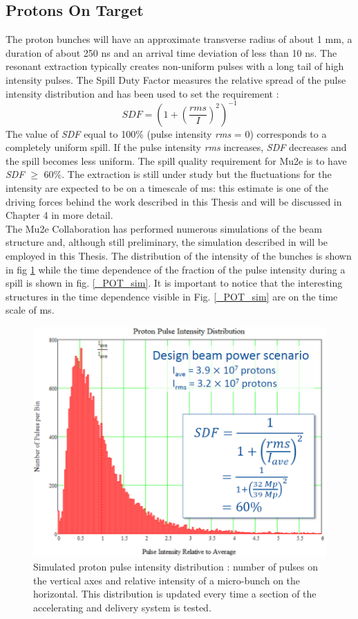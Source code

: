 \documentclass[12pt,a4paper,openright, oneside, titlepage]{book} %
\begin{document}
\subsection{Protons On Target}
The proton bunches will have an approximate transverse radius of about 1 mm, a duration of about 250 ns and an arrival time deviation of less than 10 ns.
The resonant extraction typically creates non-uniform pulses with a long tail of high intensity pulses. 
The Spill Duty Factor measures the relative spread of the pulse intensity distribution and has been used to set the requirement \cite{BeamRequirements}:
$$SDF=\left(1+\left(\frac{rms}{I}\right)^2\right)^{-1}$$
The value of {\em SDF} equal to 100\% (pulse intensity {\em rms} = 0) corresponds to a completely uniform spill. 
If the pulse intensity {\em rms} increases, {\em SDF} decreases and the spill becomes less uniform.
The spill quality requirement for Mu2e is to have {\em SDF} $\geqslant$  60\%.
The extraction is still under study but the fluctuations for the intensity are expected to be on a timescale of ms: 
this estimate is one of the driving forces behind the work described in this Thesis and will be discussed 
in Chapter 4 in more detail.\\
The Mu2e Collaboration has performed numerous simulations of the beam structure and, 
although still preliminary, the simulation described in \cite{SpillSim} will be employed in this Thesis. 
The distribution of the intensity of the bunches is shown in fig \ref{_POT_distribution} 
while the time dependence of the fraction of the pulse intensity during a spill is shown in fig. \ref{_POT_sim}. 
It is important to notice that the interesting structures in the time dependence 
visible in Fig. \ref{_POT_sim} are on the time scale of ms.
\label{_Fluctuations}

\begin{figure}[h!]
\centering
\includegraphics[scale=0.7]{POT_distribution}
\caption[Proton pulse intensity]{Simulated proton pulse intensity distribution \cite{SpillSim}: 
number of pulses on the vertical axes and relative intensity of a micro-bunch on the horizontal. 
This distribution is updated every time a section of the accelerating and delivery system is tested.}
\label{_POT_distribution}
\end{figure}
\end{document}
